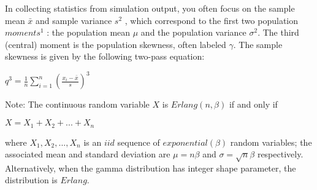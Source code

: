 \documentclass[11pt,addpoints,answers]{exam}
\begin{document}
\begin{questions}

  \question
  In collecting statistics from simulation output, you often focus on the
  sample mean $\bar{x}$ and sample variance $s^2$ , which correspond to the
  first two population $moments^1$ : the population mean $\mu$ and the
  population variance $\sigma^2$. The third (central) moment is the population
  skewness, often labeled $\gamma$. The sample skewness is given by the
  following two-pass equation:

  \begin{center}
    $q^3 = \frac{1}{n}\sum_{i=1}^{n}(\frac{x_i-\bar{x}}{s})^3$
  \end{center}
  Note: The continuous random variable $X$ is $Erlang(n,\beta)$ if and only if
  \begin{center}
    $X = X_1 + X_2 + ... + X_n$
  \end{center}
  where $X_1, X_2, . . . , X_n$ is an $iid$ sequence of $exponential(\beta)$
  random variables; the associated mean and standard deviation are $\mu =
  n\beta$ and $\sigma = \sqrt{n}\beta$ respectively. Alternatively, when the
  gamma distribution has integer shape parameter, the distribution is $Erlang$.

\end{questions}
\end{document}
